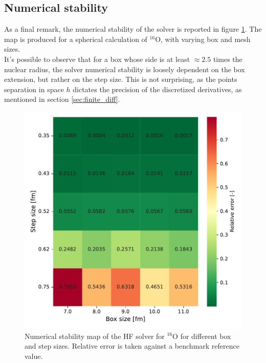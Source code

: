 \subsection{Numerical stability}
As a final remark, the numerical stability of the solver is reported in figure \ref{fig:stability}. The map is produced for a spherical calculation of $^{16}$O, with varying box and mesh sizes. 
\\It's possible to observe that for a box whose side is at least $\approx 2.5$ times the nuclear radius, the solver numerical stability is loosely dependent on the box extension, but rather on the step size. This is not surprising, as the points separation in space $h$ dictates the precision of the discretized derivatives, as mentioned in section \ref{sec:finite_diff}.
\begin{figure}[h]
    \centering
    \includegraphics[width=1.0\textwidth]{Images/stability.pdf}
    \caption{Numerical stability map of the HF solver for $^{16}$O for different box and step sizes. Relative error is taken against a benchmark reference value.}
    \label{fig:stability}
\end{figure}